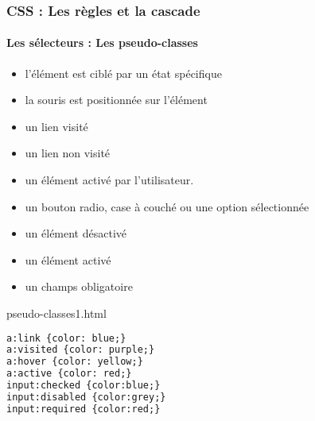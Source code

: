 \documentclass[xcolor=table]{beamer}
\begin{document}
\begin{frame}[fragile]
\frametitle{CSS : Les règles et la cascade}
\framesubtitle{Les sélecteurs : Les pseudo-classes}

\begin{minipage}{0.60\textwidth} 
	\begin{itemize}
		\item l'élément est ciblé par un état spécifique
		\item {} la souris est positionnée sur l'élément
		\item {} un lien visité
		\item {} un lien non visité
		\item {} un élément activé par l'utilisateur.
		\item {} un bouton radio, case à couché ou une option sélectionnée
		\item {} un élément désactivé
		\item {} un élément activé
		\item {} un champs obligatoire
	\end{itemize}
\end{minipage}
%
\begin{minipage}{0.38\textwidth}
\begin{block}{pseudo-classes1.html}
\scriptsize\bfseries
\begin{lstlisting}[language={html}]
a:link {color: blue;}
a:visited {color: purple;}
a:hover {color: yellow;}
a:active {color: red;}
input:checked {color:blue;}
input:disabled {color:grey;}
input:required {color:red;}
\end{lstlisting}
\end{block}
\end{minipage}
\end{frame}
\end{document}
